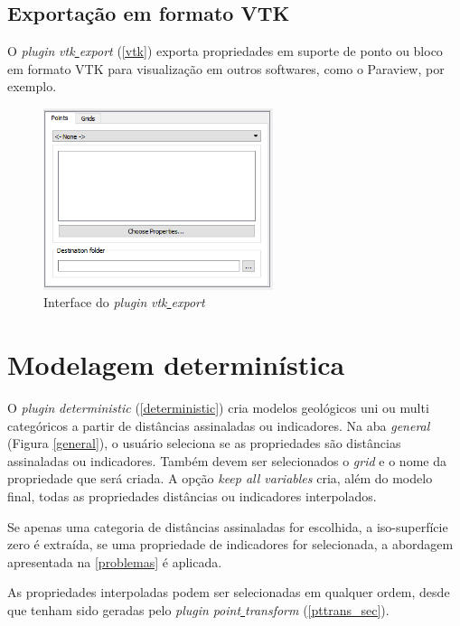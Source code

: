 \subsection{Exportação em formato VTK}

O \textit{plugin} \textit{vtk\underline{ }export} (\autoref{vtk}) exporta propriedades em suporte de ponto ou bloco em formato VTK para visualização em outros softwares, como o Paraview, por exemplo.

\begin{figure}[H]
	\caption{\label{vtk}Interface do \textit{plugin} \textit{vtk\underline{ }export}}
	\centering
		\includegraphics[width=0.6\textwidth]{apendice/imagens/vtk_export_1.PNG}
\end{figure}

\section{Modelagem determinística}

O \textit{plugin} \textit{deterministic} (\autoref{deterministic}) cria modelos geológicos uni ou multi categóricos a partir de distâncias assinaladas ou indicadores. Na aba \textit{general} (Figura \autoref{general}), o usuário seleciona se as propriedades são distâncias assinaladas ou indicadores. Também devem ser selecionados o \textit{grid} e o nome da propriedade que será criada. A opção \textit{keep all variables} cria, além do modelo final, todas as propriedades distâncias ou indicadores interpolados.

Se apenas uma categoria de distâncias assinaladas for escolhida, a iso-superfície zero é extraída, se uma propriedade de indicadores for selecionada, a abordagem apresentada na \autoref{problemas} é aplicada.
 
As propriedades interpoladas podem ser selecionadas em qualquer ordem, desde que tenham sido geradas pelo \textit{plugin} \textit{point\underline{ }transform} (\autoref{pttrans_sec}).

